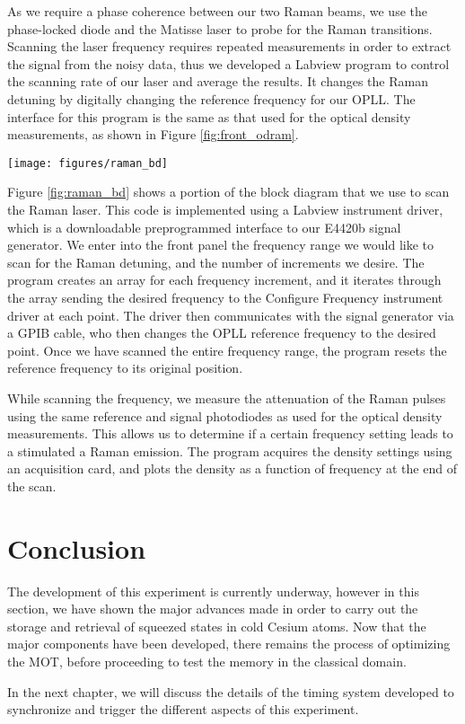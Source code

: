 As we require a phase coherence between our two Raman beams, we use the
phase-locked diode and the Matisse laser to probe for the Raman transitions.
Scanning the laser frequency requires repeated measurements in order to
extract the signal from the noisy data, thus we developed a Labview program to
control the scanning rate of our laser and average the results.  It changes
the Raman detuning by digitally changing the reference frequency for our OPLL.
The interface for this program is the same as that used for the optical
density measurements, as shown in Figure \ref{fig:front_odram}.

\begin{sidewaysfigure}[ht] 
 \centering 
 \hspace{-8em}
 \texttt{[image: figures/raman\_bd]} 
 \caption[Raman detuning scanner block diagram]{Block diagram for program to scan the phase lock frequency and adjust the detuning $\delta_R$} 
 \label{fig:raman_bd} 
\end{sidewaysfigure}

Figure \ref{fig:raman_bd} shows a portion of the block diagram that we use to
scan the Raman laser.  This code is implemented using a Labview instrument
driver, which is a downloadable preprogrammed interface to our E4420b signal
generator.  We enter into the front panel the frequency range we would like to
scan for the Raman detuning, and the number of increments we desire.  The
program creates an array for each frequency increment, and it iterates through
the array sending the desired frequency to the Configure Frequency instrument
driver at each point.  The driver then communicates with the signal generator
via a GPIB cable, who then changes the OPLL reference frequency to the desired point.  Once we have scanned the entire frequency range, the program resets the reference frequency to its original position.  

While scanning the frequency, we measure the attenuation of the Raman pulses
using the same reference and signal photodiodes as used for the optical
density measurements.  This allows us to determine if a certain frequency
setting leads to a stimulated a Raman emission.  The program acquires the density settings using an acquisition card, and plots the density as a function of frequency at the end of the scan.


\section{Conclusion}

The development of this experiment is currently underway, however in this section, we have shown the major advances made in order to carry out the storage and retrieval of squeezed states in cold Cesium atoms.  Now that the major components have been developed, there remains the process of optimizing the MOT, before proceeding to test the memory in the classical domain.

In the next chapter, we will discuss the details of the timing system developed to synchronize and trigger the different aspects of this experiment.





